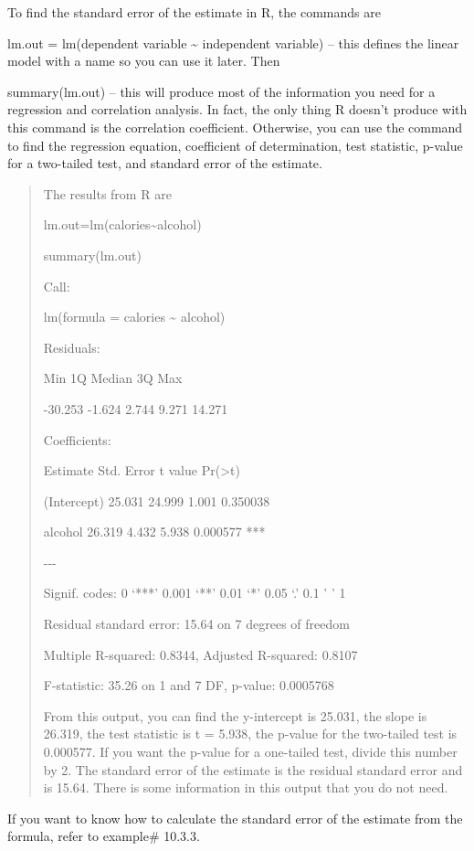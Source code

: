 \documentclass[]{book}
\begin{document}
To find the standard error of the estimate in R, the commands are

lm.out = lm(dependent variable \textasciitilde{} independent variable) -- this defines the linear model with a name so you can use it later. Then

summary(lm.out) -- this will produce most of the information you need for a regression and correlation analysis. In fact, the only thing R doesn't produce with this command is the correlation coefficient. Otherwise, you can use the command to find the regression equation, coefficient of determination, test statistic, p-value for a two-tailed test, and standard error of the estimate.

\begin{quote}
The results from R are

lm.out=lm(calories\textasciitilde{}alcohol)

summary(lm.out)

Call:

lm(formula = calories \textasciitilde{} alcohol)

Residuals:

Min 1Q Median 3Q Max

-30.253 -1.624 2.744 9.271 14.271

Coefficients:

Estimate Std. Error t value Pr(\textgreater{}\textbar{}t\textbar{})

(Intercept) 25.031 24.999 1.001 0.350038

alcohol 26.319 4.432 5.938 0.000577 ***

-\/-\/-

Signif. codes: 0 `***' 0.001 `**' 0.01 `*' 0.05 `.' 0.1 ' ' 1

Residual standard error: 15.64 on 7 degrees of freedom

Multiple R-squared: 0.8344, Adjusted R-squared: 0.8107

F-statistic: 35.26 on 1 and 7 DF, p-value: 0.0005768

From this output, you can find the y-intercept is 25.031, the slope is
26.319, the test statistic is t = 5.938, the p-value for the
two-tailed test is 0.000577. If you want the p-value for a one-tailed
test, divide this number by 2. The standard error of the estimate is
the residual standard error and is 15.64. There is some information in
this output that you do not need.
\end{quote}

If you want to know how to calculate the standard error of the estimate from the formula, refer to example\# 10.3.3.
\end{document}
